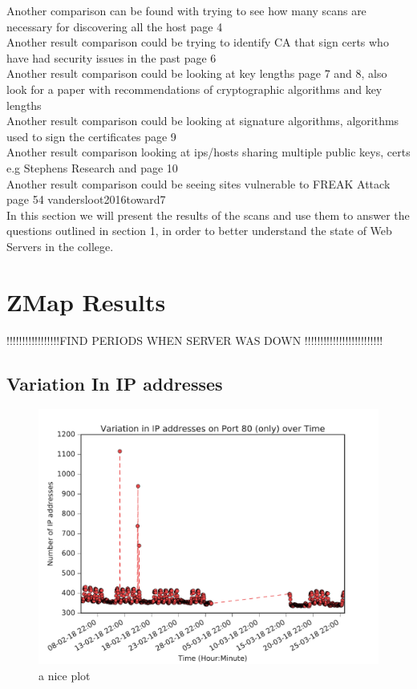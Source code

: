 \documentclass[a4wide,leqno,12pt]{report}
\begin{document}
Another comparison can be found with trying to see how many scans are necessary for discovering all the host \cite{durumeric2013analysis} page 4\\

Another result comparison could be trying to identify CA that sign certs who have had security issues in the past \cite{durumeric2013analysis} page 6\\

Another result comparison could be looking at key lengths \cite{durumeric2013analysis} page 7 and 8, also look for a paper with recommendations of cryptographic algorithms and key lengths\\

Another result comparison could be looking at signature algorithms, algorithms used to sign the certificates \cite{durumeric2013analysis} page 9\\

Another result comparison looking at ips/hosts sharing multiple public keys, certs e.g Stephens Research and \cite{durumeric2013analysis} page 10\\

Another result comparison could be seeing sites vulnerable to FREAK Attack \cite{vandersloot2016toward} page 54
vandersloot2016toward7\\


In this section we will
present the results of the scans and use them to answer the questions outlined in section 1, in order to better understand the state of Web Servers in the college.


\section{ZMap Results}
!!!!!!!!!!!!!!!!!FIND PERIODS WHEN SERVER WAS DOWN !!!!!!!!!!!!!!!!!!!!!!!!!


\subsection{Variation In IP addresses}
\begin{figure}[H]
\centering
\includegraphics[scale=.5]{pdf_images/VariationInIpAddressesOnPort80OverTime}
\caption{a nice plot}
\label{fig:port80ZMap}
\end{figure}
\end{document}
